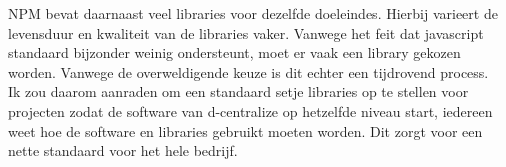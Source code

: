 NPM bevat daarnaast veel libraries voor dezelfde doeleindes. Hierbij varieert de levensduur en kwaliteit van de libraries vaker. Vanwege het feit dat javascript standaard bijzonder weinig ondersteunt, moet er vaak een library gekozen worden. Vanwege de overweldigende keuze is dit echter een tijdrovend process. \\

Ik zou daarom aanraden om een standaard setje libraries op te stellen voor projecten zodat de software van d-centralize op hetzelfde niveau start, iedereen weet hoe de software en libraries gebruikt moeten worden. Dit zorgt voor een nette standaard voor het hele bedrijf. \\